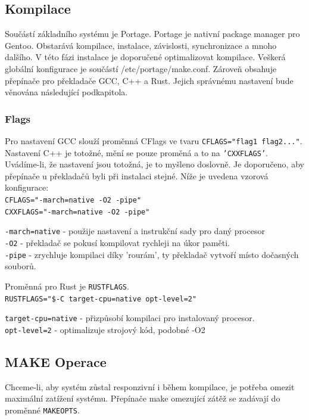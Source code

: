 \documentclass[12pt,a4paper,twoside,]{article}
\begin{document}
{{{{{{{\newpage
\subsection{\textsf{Kompilace}}
Součástí základního systému je Portage. Portage je nativní package manager pro Gentoo.
Obstarává kompilace, instalace, závislosti, synchronizace a mnoho dalšího. V této fázi instalace
je doporučené optimalizovat kompilace. Veškerá globální konfigurace je součástí /etc/portage/make.conf.
Zároveň obsahuje přepínače pro překladače GCC, C++ a Rust. Jejich správnému nastavení bude věnována následující podkapitola.

\subsubsection{\textsf{Flags}}
Pro nastavení GCC slouží proměnná CFlags ve tvaru \texttt{CFLAGS="flag1 flag2..."}. Nastavení C++ je totožné, mění se pouze proměná a to na \texttt{'CXXFLAGS'}.
Uvádíme-li, že nastavení jsou totožná, je to myšleno doslovně. Je doporučeno, aby přepínače u překladačů byli při instalaci stejné. Níže je uvedena
vzorová konfigurace:\\

\texttt{CFLAGS="-march=native -O2 -pipe"}\\
\hspace*{1.5em}\texttt{CXXFLAGS="-march=native -O2 -pipe"}

\hspace{-1.5em}\texttt{-march=native} - použije nastavení a instrukční sady pro daný procesor\\
\texttt{-O2} - překladač se pokusí kompilovat rychleji na úkor paměti.\\
\texttt{-pipe} - zrychluje kompilaci díky 'rourám', ty překladač vytvoří místo dočasných souborů.

\hspace{-1.5em}Proměnná pro Rust je \texttt{RUSTFLAGS}.\\

\texttt{RUSTFLAGS="\$-C target-cpu=native opt-level=2"}

\hspace{-1.5em}\texttt{target-cpu=native} - přizpůsobí kompilaci pro instalovaný procesor.\\
\texttt{opt-level=2} - optimalizuje strojový kód, podobné -O2 %
\subsection{\textsf{MAKE Operace}}
Chceme-li, aby systém zůstal responzivní i během kompilace, je potřeba omezit maximální zatížení systému.
Přepínače make omezující zátěž se zadávají do proměnné \texttt{MAKEOPTS}.

}}}}}}}
\end{document}
